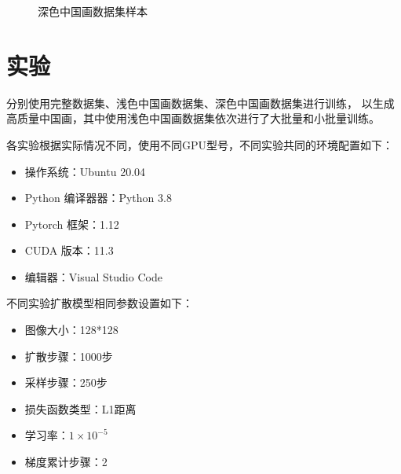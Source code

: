 \begin{figure}[ht]
    \caption{深色中国画数据集样本}\label{fig:yellow_dataset_samples}
\end{figure}


\section{实验}

分别使用完整数据集、浅色中国画数据集、深色中国画数据集进行训练，
以生成高质量中国画，其中使用浅色中国画数据集依次进行了大批量和小批量训练。

各实验根据实际情况不同，使用不同GPU型号，不同实验共同的环境配置如下：
\begin{itemize}
    \item 操作系统：Ubuntu 20.04
    \item Python 编译器器：Python 3.8
    \item Pytorch 框架：1.12
    \item CUDA 版本：11.3
    \item 编辑器：Visual Studio Code 
\end{itemize}

不同实验扩散模型相同参数设置如下：
\begin{itemize}
    \item 图像大小：128*128
    \item 扩散步骤：1000步
    \item 采样步骤：250步
    \item 损失函数类型：L1距离
    \item 学习率：{$1\times10^{-5}$}
    \item 梯度累计步骤：2
\end{itemize}

